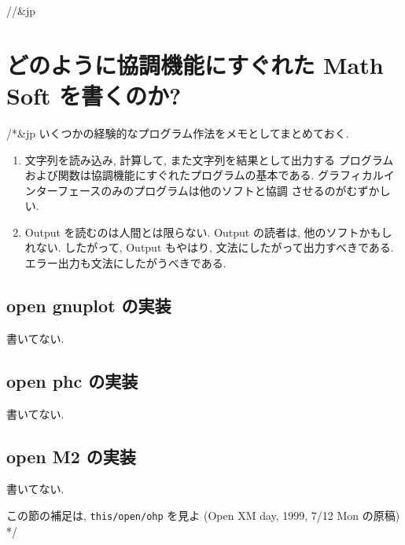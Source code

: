 //&jp \section{ どのように協調機能にすぐれた Math Soft を書くのか? }

/*&jp
いくつかの経験的なプログラム作法をメモとしてまとめておく.
\begin{enumerate}
\item 文字列を読み込み, 計算して, また文字列を結果として出力する
プログラムおよび関数は協調機能にすぐれたプログラムの基本である.
グラフィカルインターフェースのみのプログラムは他のソフトと協調
させるのがむずかしい.
\item Output を読むのは人間とは限らない. 
Output の読者は, 他のソフトかもしれない.
したがって, Output もやはり, 文法にしたがって出力すべきである.
エラー出力も文法にしたがうべきである.
\end{enumerate}

\subsection{open gnuplot の実装}
書いてない.

\subsection{open phc の実装}
書いてない.

\subsection{open M2 の実装}
書いてない.

この節の補足は,
{\tt this/open/ohp} を見よ (Open XM day, 1999, 7/12 Mon の原稿)
*/
